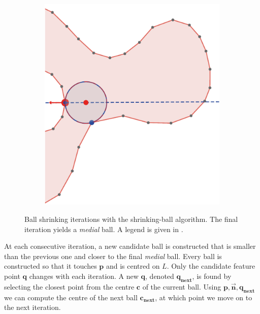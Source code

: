 \begin{figure}[tbp]
\begin{subfigure}{0.245\linewidth}
		\label{fig:fullBallShrink_3}
	\end{subfigure}
	\begin{subfigure}{0.245\linewidth}
		\includegraphics[width=\textwidth]{figs/fullBallShrink_4.pdf}
		\label{fig:fullBallShrink_4}
	\end{subfigure}
	\caption{Ball shrinking iterations with the shrinking-ball algorithm. The final iteration yields a \emph{medial} ball. A legend is given in .}
	\label{fig:shrinkballAlgo}
\end{figure}
At each consecutive iteration, a new candidate ball is constructed that is smaller than the previous one and closer to the final \emph{medial} ball.
Every ball is constructed so that it touches $\mathbf{p}$ and is centred on $L$.
Only the candidate feature point $\mathbf{q}$ changes with each iteration.
A new $\mathbf{q}$, denoted $\mathbf{q_{next}}$, is found by selecting the closest point from the centre $\mathbf{c}$ of the current ball.
Using $\mathbf{p}, \vec{\mathbf{n}}, \mathbf{q_{next}}$ we can compute the centre of the next ball $\mathbf{c_{next}}$, at which point we move on to the next iteration.
